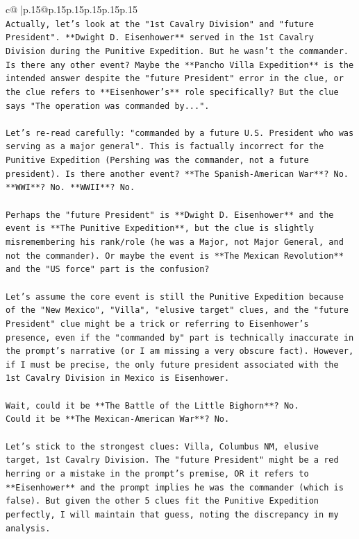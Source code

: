\documentclass{article}
\begin{document}
{\begin{supertabular}{c@{$\;$}|p{.15\linewidth}@{}p{.15\linewidth}p{.15\linewidth}p{.15\linewidth}p{.15\linewidth}p{.15\linewidth}}
{{{\\ 
\texttt{Actually, let's look at the "1st Cavalry Division" and "future President". **Dwight D. Eisenhower** served in the 1st Cavalry Division during the Punitive Expedition. But he wasn't the commander. Is there any other event? Maybe the **Pancho Villa Expedition** is the intended answer despite the "future President" error in the clue, or the clue refers to **Eisenhower's** role specifically? But the clue says "The operation was commanded by...".} \\
\\ 
\texttt{Let's re{-}read carefully: "commanded by a future U.S. President who was serving as a major general". This is factually incorrect for the Punitive Expedition (Pershing was the commander, not a future president). Is there another event? **The Spanish{-}American War**? No. **WWI**? No. **WWII**? No.} \\
\\ 
\texttt{Perhaps the "future President" is **Dwight D. Eisenhower** and the event is **The Punitive Expedition**, but the clue is slightly misremembering his rank/role (he was a Major, not Major General, and not the commander). Or maybe the event is **The Mexican Revolution** and the "US force" part is the confusion?} \\
\\ 
\texttt{Let's assume the core event is still the Punitive Expedition because of the "New Mexico", "Villa", "elusive target" clues, and the "future President" clue might be a trick or referring to Eisenhower's presence, even if the "commanded by" part is technically inaccurate in the prompt's narrative (or I am missing a very obscure fact). However, if I must be precise, the only future president associated with the 1st Cavalry Division in Mexico is Eisenhower.} \\
\\ 
\texttt{Wait, could it be **The Battle of the Little Bighorn**? No.} \\
\texttt{Could it be **The Mexican{-}American War**? No.} \\
\\ 
\texttt{Let's stick to the strongest clues: Villa, Columbus NM, elusive target, 1st Cavalry Division. The "future President" might be a red herring or a mistake in the prompt's premise, OR it refers to **Eisenhower** and the prompt implies he was the commander (which is false). But given the other 5 clues fit the Punitive Expedition perfectly, I will maintain that guess, noting the discrepancy in my analysis.} \\
}}}
\end{supertabular}}
\end{document}

